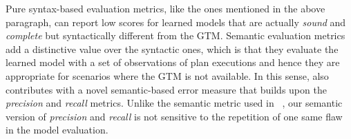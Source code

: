 Pure syntax-based evaluation metrics, like the ones mentioned in the above paragraph, can report low scores for learned models that are actually {\em sound} and {\em complete} but syntactically different from the GTM. Semantic evaluation metrics add a distinctive value over the syntactic ones, which is that they evaluate the learned model with a set of observations of plan executions and hence they are appropriate for scenarios where the GTM is not available. In this sense, \FAMA also contributes with a novel semantic-based error measure that builds upon the {\em precision} and {\em recall} metrics. Unlike the semantic metric used in \ARMS~\cite{yang2007learning}, our semantic version of {\em precision} and {\em recall} is not sensitive to the repetition of one same flaw in the model evaluation.





